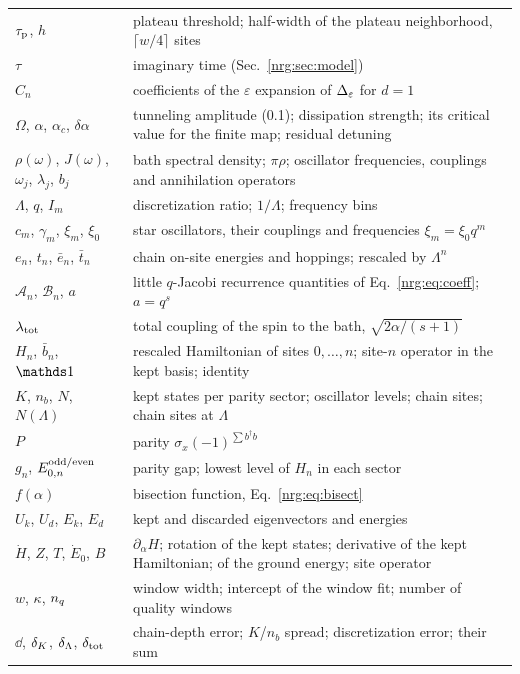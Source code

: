 \begin{longtable}{@{}>{\raggedright\arraybackslash}p{3.4cm}p{12.2cm}@{}}
$\tau_{\rm p}$, $h$ & plateau threshold; half-width of the plateau neighborhood, $\lceil w/4\rceil$ sites\\
$\tau$ & imaginary time (Sec.~\ref{nrg:sec:model})\\
$C_n$ & coefficients of the $\varepsilon$ expansion of $\Delta_\varepsilon$ for $d=1$\\
$\Omega$, $\alpha$, $\alpha_c$, $\delta\alpha$ & tunneling amplitude (0.1); dissipation strength; its critical value for the finite map; residual detuning\\
$\rho(\omega)$, $J(\omega)$, $\omega_j$, $\lambda_j$, $b_j$ & bath spectral density; $\pi\rho$; oscillator frequencies, couplings and annihilation operators\\
$\Lambda$, $q$, $I_m$ & discretization ratio; $1/\Lambda$; frequency bins\\
$c_m$, $\gamma_m$, $\xi_m$, $\xi_0$ & star oscillators, their couplings and frequencies $\xi_m=\xi_0q^m$\\
$e_n$, $t_n$, $\bar e_n$, $\bar t_n$ & chain on-site energies and hoppings; rescaled by $\Lambda^n$\\
$\mathcal A_n$, $\mathcal B_n$, $a$ & little $q$-Jacobi recurrence quantities of Eq.~\eqref{nrg:eq:coeff}; $a=q^s$\\
$\lambda_{\rm tot}$ & total coupling of the spin to the bath, $\sqrt{2\alpha/(s+1)}$\\
$H_n$, $\bar b_n$, $\one$ & rescaled Hamiltonian of sites $0,\dots,n$; site-$n$ operator in the kept basis; identity\\
$K$, $n_b$, $N$, $N(\Lambda)$ & kept states per parity sector; oscillator levels; chain sites; chain sites at $\Lambda$\\
$P$ & parity $\sigma_x(-1)^{\sum b^\dagger b}$\\
$g_n$, $E^{\rm odd/even}_{0,n}$ & parity gap; lowest level of $H_n$ in each sector\\
$f(\alpha)$ & bisection function, Eq.~\eqref{nrg:eq:bisect}\\
$U_k$, $U_d$, $E_k$, $E_d$ & kept and discarded eigenvectors and energies\\
$\dot H$, $Z$, $T$, $\dot E_0$, $B$ & $\partial_\alpha H$; rotation of the kept states; derivative of the kept Hamiltonian; of the ground energy; site operator\\
$w$, $\kappa$, $n_q$ & window width; intercept of the window fit; number of quality windows\\
$\dd$, $\delta_K$, $\delta_\Lambda$, $\delta_{\rm tot}$ & chain-depth error; $K$/$n_b$ spread; discretization error; their sum\\

\end{longtable}
